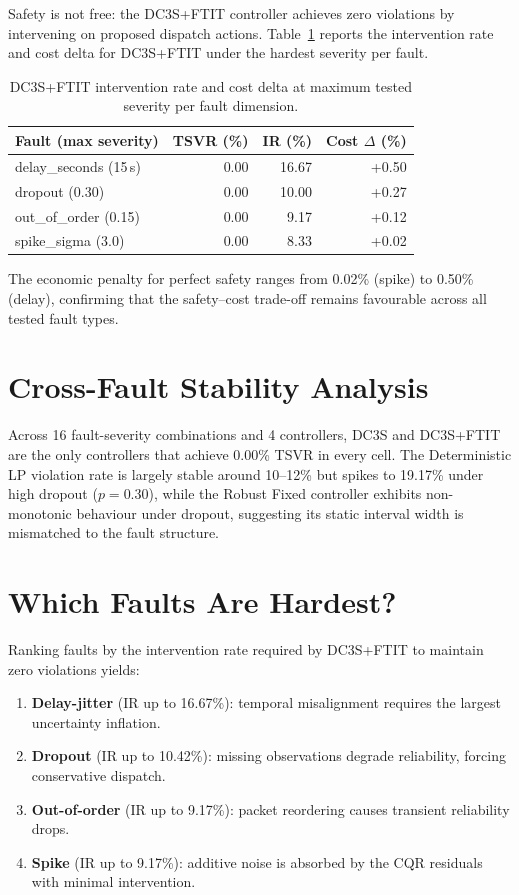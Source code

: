 Safety is not free: the DC3S+FTIT controller achieves zero violations
by intervening on proposed dispatch actions.  Table~\ref{tab:fault-ir}
reports the intervention rate and cost delta for DC3S+FTIT under the
hardest severity per fault.

\begin{table}[ht]
\centering
\caption{DC3S+FTIT intervention rate and cost delta at maximum
  tested severity per fault dimension.}
\label{tab:fault-ir}
\begin{tabular}{lrrr}
\toprule
\textbf{Fault (max severity)} & \textbf{TSVR (\%)} &
  \textbf{IR (\%)} & \textbf{Cost $\Delta$ (\%)} \\
\midrule
delay\_seconds (15\,s) & 0.00 & 16.67 & +0.50 \\
dropout (0.30)         & 0.00 & 10.00 & +0.27 \\
out\_of\_order (0.15)  & 0.00 &  9.17 & +0.12 \\
spike\_sigma (3.0)     & 0.00 &  8.33 & +0.02 \\
\bottomrule
\end{tabular}
\end{table}

The economic penalty for perfect safety ranges from 0.02\% (spike) to
0.50\% (delay), confirming that the safety--cost trade-off remains
favourable across all tested fault types.

\section{Cross-Fault Stability Analysis}

Across 16 fault-severity combinations and 4 controllers, DC3S and
DC3S+FTIT are the only controllers that achieve 0.00\% TSVR in every
cell.  The Deterministic LP violation rate is largely stable around
10--12\% but spikes to 19.17\% under high dropout ($p=0.30$), while
the Robust Fixed controller exhibits non-monotonic behaviour under
dropout, suggesting its static interval width is mismatched to the
fault structure.

\section{Which Faults Are Hardest?}

Ranking faults by the intervention rate required by DC3S+FTIT to
maintain zero violations yields:

\begin{enumerate}
  \item \textbf{Delay-jitter} (IR up to 16.67\%): temporal
    misalignment requires the largest uncertainty inflation.
  \item \textbf{Dropout} (IR up to 10.42\%): missing observations
    degrade reliability, forcing conservative dispatch.
  \item \textbf{Out-of-order} (IR up to 9.17\%): packet reordering
    causes transient reliability drops.
  \item \textbf{Spike} (IR up to 9.17\%): additive noise is absorbed
    by the CQR residuals with minimal intervention.
\end{enumerate}

